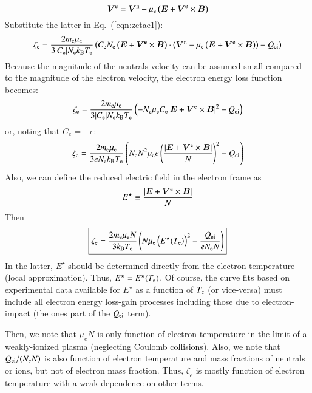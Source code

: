 \documentclass{warpdoc}
\newcommand\frameeqn[1]{\fbox{$\displaystyle #1$}}
\renewcommand{\vec}[1]{\bm{#1}}
\begin{document}
%
\begin{equation}
  \vec{V}^{\rm e}=\vec{V}^{\rm n} - \mu_{\rm e} \left(\vec{E}+\vec{V}^{\rm e} \times \vec{B}\right)
\end{equation}
% 
Substitute the latter in Eq.\ (\ref{eqn:zetae1}):
%
\begin{equation}
  \zeta_{\rm e}  
=  
 \frac{2 m_{\rm e} \mu_{\rm e}}{3 |C_{\rm e}| N_{\rm e} k_{\rm B} T_{\rm e} }
\left( C_{\rm e} N_{\rm e} \left(\vec{E} + \vec{V^{\rm e}} \times \vec{B}\right)\cdot \left(\vec{V}^{\rm n} - \mu_{\rm e} \left(\vec{E}+\vec{V}^{\rm e} \times \vec{B}\right)\right)
 - Q_{\rm ei}\right)
 \end{equation}
%
Because the magnitude of the neutrals velocity can be assumed small compared to the magnitude of the electron velocity, the electron energy loss function becomes:
%
\begin{equation}
  \zeta_{\rm e}  
=  
 \frac{2 m_{\rm e} \mu_{\rm e}}{3 |C_{\rm e}| N_{\rm e} k_{\rm B} T_{\rm e} }
\left(  -N_{\rm e} \mu_{\rm e} C_{\rm e} |\vec{E}+\vec{V}^{\rm e}\times \vec{B}|^2
 - Q_{\rm ei}\right)
 \end{equation}
%
or, noting that $C_e = -e$:
%
\begin{equation}
  \zeta_{\rm e}  
=  
 \frac{2 m_{\rm e} \mu_{\rm e}}{3 e N_{\rm e} k_{\rm B} T_{\rm e} }
\left(  N_{\rm e} N^2 \mu_{\rm e} e \left(\frac{|\vec{E}+\vec{V}^{\rm e}\times \vec{B}|}{N}\right)^2
 - Q_{\rm ei}\right)
 \end{equation}
%
Also, we can define the reduced electric field in the electron frame as 
%
\begin{equation}
E^\star\equiv \frac{|\vec{E}+\vec{V}^{\rm e}\times \vec{B}|}{N}
\end{equation}
%
Then
%
\begin{equation}
\frameeqn{
  \zeta_{\rm e}  
=  
 \frac{2 m_{\rm e} \mu_{\rm e} N}{3  k_{\rm B} T_{\rm e} }
\left( N \mu_{\rm e}  \left(E^\star(T_{\rm e})\right)^2
 - \frac{Q_{\rm ei}}{e N_{\rm e} N}\right)
}
\label{eqn:zetae}
 \end{equation}
%
In the latter, $E^\star$ should be determined directly from the electron temperature (local approximation). Thus, $E^\star=E^\star(T_{\rm e})$. Of course, the curve fits based on experimental data available for $E^\star$ as a function of $T_{\rm e}$ (or vice-versa) must include all electron energy loss-gain processes including those due to electron-impact (the ones part of the $Q_{\rm ei}$ term).    

Then, we note that $\mu_e N$ is only function of electron temperature in the limit of a weakly-ionized plasma (neglecting Coulomb collisions). Also, we note that $Q_{\rm ei}/(N_e N)$ is also function of electron temperature and mass fractions of neutrals or ions, but not of electron mass fraction. Thus, $\zeta_e$ is mostly function of electron temperature with a weak dependence on other terms. 
\end{document}
